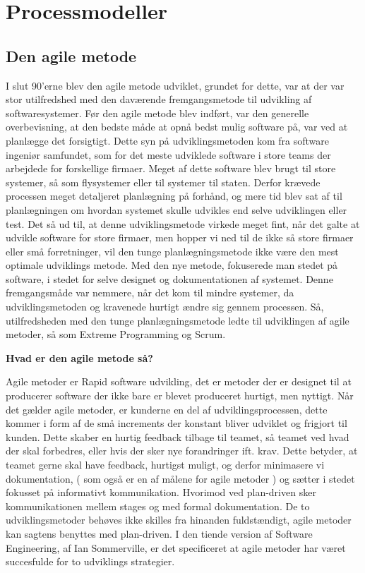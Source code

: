 \chapter{Processmodeller}\label{ch:processmodeller}

\section{Den agile metode}
I slut 90’erne blev den agile metode udviklet, grundet for dette, var at der var stor utilfredshed med den daværende fremgangsmetode til udvikling af softwaresystemer. Før den agile metode blev indført, var den generelle overbevisning, at den bedste måde at opnå bedst mulig software på, var ved at planlægge det forsigtigt. Dette syn på udviklingsmetoden kom fra software ingeniør samfundet, som for det meste udviklede software i store teams der arbejdede for forskellige firmaer. Meget af dette software blev brugt til store systemer, så som flysystemer eller til systemer til staten. Derfor krævede processen meget detaljeret planlægning på forhånd, og mere tid blev sat af til planlægningen om hvordan systemet skulle udvikles end selve udviklingen eller test.
Det så ud til, at denne udviklingsmetode virkede meget fint, når det galte at udvikle software for store firmaer, men hopper vi ned til de ikke så store firmaer eller små forretninger, vil den tunge planlægningsmetode ikke være den mest optimale udviklings metode. Med den nye metode, fokuserede man stedet på software, i stedet for selve designet og dokumentationen af systemet. Denne fremgangsmåde var nemmere, når det kom til mindre systemer, da  udviklingsmetoden og kravenede hurtigt ændre sig gennem processen. \cite{Sommerville}
Så, utilfredsheden med den tunge planlægningsmetode ledte til udviklingen af agile metoder, så som Extreme Programming og Scrum.


\textbf{Hvad er den agile metode så?}

Agile metoder er Rapid software udvikling, det er metoder der er designet til at producerer software der ikke bare er blevet produceret hurtigt, men nyttigt. \cite{Sommerville} Når det gælder agile metoder, er kunderne en del af udviklingsprocessen, dette kommer i form af de små increments der konstant bliver udviklet og frigjort til kunden. Dette skaber en hurtig feedback tilbage til teamet, så teamet ved hvad der skal forbedres, eller hvis der sker nye forandringer ift. krav. Dette betyder, at teamet gerne skal have feedback, hurtigst muligt, og derfor minimasere vi dokumentation, ( som også er en af målene for agile metoder ) og sætter i stedet fokusset på informativt kommunikation. Hvorimod ved plan-driven sker kommunikationen mellem stages og med formal dokumentation. De to udviklingsmetoder behøves ikke skilles fra hinanden fuldstændigt, agile metoder kan sagtens benyttes med plan-driven. \cite{Sommerville}
I den tiende version af Software Engineering, af Ian Sommerville, er det specificeret at agile metoder har været succesfulde for to udviklings strategier.

